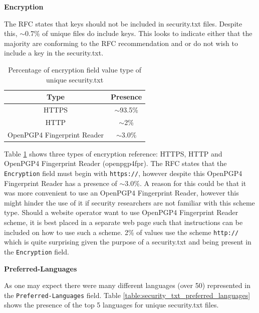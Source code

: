 \documentclass{mscreport}
\begin{document}
\vspace{0.7cm} \noindent
\textbf{Encryption}

\noindent
The RFC states that keys should not be included in security.txt files. Despite this, $\sim$0.7\% of unique files do include keys. This looks to indicate either that the majority are conforming to the RFC recommendation and or do not wish to include a key in the security.txt.

\begin{table}[H]
  \begin{center}
    \begin{tabular}{|c|c|}  %
      \hline
      \textbf{Type} & \textbf{Presence}\\
      \hline
      HTTPS & $\sim$93.5\%\\
      \hline
      HTTP & $\sim$2\%\\
      \hline
      OpenPGP4 Fingerprint Reader & $\sim$3.0\%\\
      \hline
    \end{tabular}
    \caption{Percentage of encryption field value type of unique security.txt}
    \label{table:security_txt_encryption_type} %
  \end{center}
\end{table}


\noindent
Table \ref{table:security_txt_encryption_type} shows three types of encryption reference: HTTPS, HTTP and OpenPGP4 Fingerprint Reader (openpgp4fpr). The RFC states that the \texttt{Encryption} field must begin with \texttt{https://}, however despite this OpenPGP4 Fingerprint Reader has a presence of $\sim$3.0\%. A reason for this could be that it was more convenient to use an OpenPGP4 Fingerprint Reader, however this might hinder the use of it if security researchers are not familiar with this scheme type. Should a website operator want to use OpenPGP4 Fingerprint Reader scheme, it is best placed in a separate web page such that instructions can be included on how to use such a scheme. 2\% of values use the scheme \texttt{http://} which is quite surprising given the purpose of a security.txt and being present in the \texttt{Encryption} field.

\vspace{0.7cm} \noindent
\textbf{Preferred-Languages}

\noindent
As one may expect there were many different languages (over 50) represented in the \texttt{Preferred-Languages} field. Table \ref{table:security_txt_preferred_languages} shows the presence of the top 5 languages for unique security.txt files.
\end{document}
